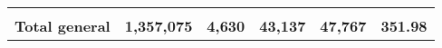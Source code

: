 \begin{tabular}{lrcclr}
	& \multicolumn{1}{l}{}                                           & \multicolumn{1}{l}{}                                       & \multicolumn{1}{l}{} &                                                                     & \multicolumn{1}{l}{}                                                         \\
	\rowcolor[HTML]{DDEBF7} 
	\textbf{Total   general}                                       & \textbf{1,357,075}                                             & \multicolumn{1}{r}{\cellcolor[HTML]{DDEBF7}\textbf{4,630}} & \textbf{43,137}      & \textbf{47,767}                                                     & \textbf{351.98}                                                             
\end{tabular}